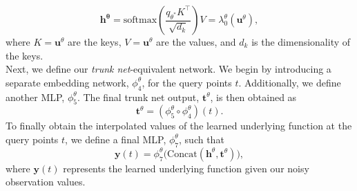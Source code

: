 \documentclass{article}
\theoremstyle{plain}
\theoremstyle{definition}
\theoremstyle{remark}
\begin{document}
\[
\mathbf{h^{\theta}} = \text{softmax}\left(\frac{q_{\theta^*} K^\top}{\sqrt{d_k}}\right) V = \lambda^{\theta}_0(\mathbf{u}^{\theta}),
\]
where \(K = \mathbf{u}^{\theta}\) are the keys, \(V = \mathbf{u}^{\theta}\) are the values, and \(d_k\) is the dimensionality of the keys.\\
Next, we define our \emph{trunk net}-equivalent network. We begin by introducing a separate embedding network, $\phi^{\theta}_4$, for the query points $t$. Additionally, we define another MLP, $\phi^{\theta}_5$. The final trunk net output, $\mathbf{t}^{\theta}$, is then obtained as
\[
    \mathbf{t}^{\theta} = (\phi^{\theta}_5 \circ \phi^{\theta}_4)(t).
\]
To finally obtain the interpolated values of the learned underlying function at the query points $t$, we define a final MLP, $\phi^{\theta}_7$, such that
\[
    \mathbf{y}(t) = \phi^{\theta}_7\big(\text{Concat}(\mathbf{h}^{\theta}, \mathbf{t}^{\theta})\big),
\]
where $\mathbf{y}(t)$ represents the learned underlying function given our noisy observation values.
\end{document}
